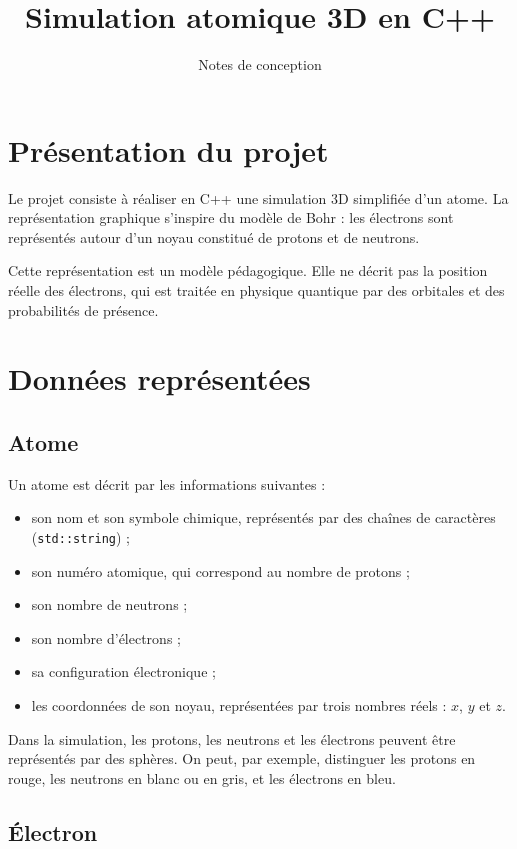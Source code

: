 \documentclass[a4paper,11pt]{article}
\title{Simulation atomique 3D en C++}
\author{Notes de conception}
\date{}
\begin{document}
\maketitle

\section{Présentation du projet}

Le projet consiste à réaliser en C++ une simulation 3D simplifiée d'un atome.
La représentation graphique s'inspire du modèle de Bohr : les électrons sont
représentés autour d'un noyau constitué de protons et de neutrons.

Cette représentation est un modèle pédagogique. Elle ne décrit pas la position
réelle des électrons, qui est traitée en physique quantique par des orbitales
et des probabilités de présence.

\section{Données représentées}

\subsection{Atome}

Un atome est décrit par les informations suivantes :
\begin{itemize}[nosep]
    \item son nom et son symbole chimique, représentés par des chaînes de
          caractères (\texttt{std::string}) ;
    \item son numéro atomique, qui correspond au nombre de protons ;
    \item son nombre de neutrons ;
    \item son nombre d'électrons ;
    \item sa configuration électronique ;
    \item les coordonnées de son noyau, représentées par trois nombres
          réels : \(x\), \(y\) et \(z\).
\end{itemize}

Dans la simulation, les protons, les neutrons et les électrons peuvent être
représentés par des sphères. On peut, par exemple, distinguer les protons en
rouge, les neutrons en blanc ou en gris, et les électrons en bleu.

\subsection{Électron}
\end{document}
